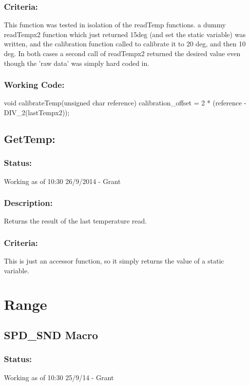\documentclass[]{article}
\begin{document}
\subsubsection{Criteria:}
This function was tested in isolation of the readTemp functions. a dummy readTempx2 function which just returned 15deg (and set the static variable) was written, and the calibration function called to calibrate it to 20 deg, and then 10 deg. In both cases a second call of readTempx2 returned the desired value even though the 'raw data' was simply hard coded in.

\subsubsection{Working Code:}
void calibrateTemp(unsigned char reference)
{
	calibration\_offset = 2 * (reference - DIV\_2(lastTempx2));
}

\subsection{GetTemp:}

\subsubsection{Status:}
Working as of 10:30 26/9/2014 - Grant

\subsubsection{Description:}
Returns the result of the last temperature read.

\subsubsection{Criteria:}
This is just an accessor function, so it simply returns the value of a static variable.

\section{Range}

\subsection{SPD\_SND Macro}
\subsubsection{Status:}
Working as of 10:30 25/9/14 - Grant
\end{document}
